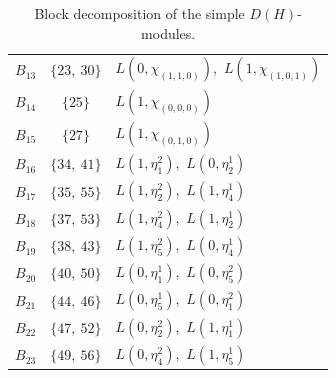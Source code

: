 \begin{table}[ht]
\begin{tabular}{c|c|l}
$B_{13}$ & $\{23,\ 30\}$ & $L(0,\chi_{(1,1,0)})$,\ $L(1,\chi_{(1,0,1)})$ \\
$B_{14}$ & $\{25\}$ & $L(1,\chi_{(0,0,0)})$ \\
$B_{15}$ & $\{27\}$ & $L(1,\chi_{(0,1,0)})$ \\
$B_{16}$ & $\{34,\ 41\}$ & $L(1,\eta^{2}_{1})$,\ $L(0,\eta^{1}_{2})$ \\
$B_{17}$ & $\{35,\ 55\}$ & $L(1,\eta^{2}_{2})$,\ $L(1,\eta^{1}_{4})$ \\
$B_{18}$ & $\{37,\ 53\}$ & $L(1,\eta^{2}_{4})$,\ $L(1,\eta^{1}_{2})$ \\
$B_{19}$ & $\{38,\ 43\}$ & $L(1,\eta^{2}_{5})$,\ $L(0,\eta^{1}_{4})$ \\
$B_{20}$ & $\{40,\ 50\}$ & $L(0,\eta^{1}_{1})$,\ $L(0,\eta^{2}_{5})$ \\
$B_{21}$ & $\{44,\ 46\}$ & $L(0,\eta^{1}_{5})$,\ $L(0,\eta^{2}_{1})$ \\
$B_{22}$ & $\{47,\ 52\}$ & $L(0,\eta^{2}_{2})$,\ $L(1,\eta^{1}_{1})$ \\
$B_{23}$ & $\{49,\ 56\}$ & $L(0,\eta^{2}_{4})$,\ $L(1,\eta^{1}_{5})$ \\
\end{tabular}
\caption{Block decomposition of the simple $D(H)$-modules.}
\label{tab:block-decomposition}
\end{table}

